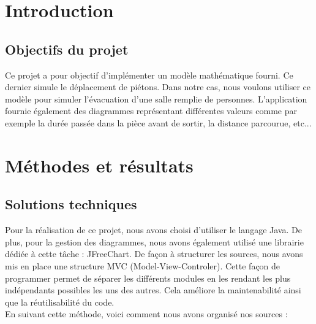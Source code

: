 \documentclass[twoside,UTF8]{EPURapport}
\begin{document}
\chapter{Introduction}
	\section{Objectifs du projet}
	Ce projet a pour objectif d'implémenter un modèle mathématique fourni. Ce dernier simule le déplacement de piétons. Dans notre cas, nous voulons utiliser ce modèle pour simuler l'évacuation d'une salle remplie de personnes. L'application fournie également des diagrammes représentant différentes valeurs comme par exemple la durée passée dans la pièce avant de sortir, la distance parcourue, etc...
	
\chapter{Méthodes et résultats}
	
	\section{Solutions techniques}
	Pour la réalisation de ce projet, nous avons choisi d'utiliser le langage Java. De plus, pour la gestion des diagrammes, nous avons également utilisé une librairie dédiée à cette tâche : JFreeChart. De façon à structurer les sources, nous avons mis en place une structure MVC (Model-View-Controler). Cette façon de programmer permet de séparer les différents modules en les rendant les plus indépendants possibles les uns des autres. Cela améliore la maintenabilité ainsi que la réutilisabilité du code.\\
	En suivant cette méthode, voici comment nous avons organisé nos sources :
	
\end{document}
